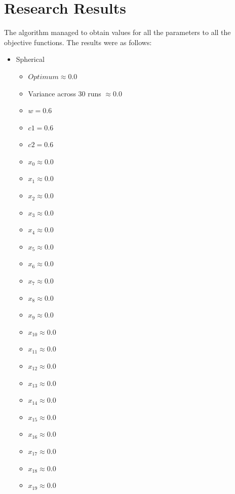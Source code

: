 \documentclass[hidelinks,english,conference]{IEEEtran}
\begin{document}
\section{Research Results}\label{researchResultsSection}
The algorithm managed to obtain values for all the parameters to all the objective functions. The results were as follows:
\begin{itemize}
	\item Spherical\\
		\begin{itemize}
			\item $Optimum \approx 0.0$
			\item Variance across 30 runs $ \approx 0.0$
			\item $w = 0.6$
			\item $c1 = 0.6$
			\item $c2 = 0.6$
			\item $x_{0} \approx 0.0$
			\item $x_{1} \approx 0.0$
			\item $x_{2} \approx 0.0$
			\item $x_{3} \approx 0.0$
			\item $x_{4} \approx 0.0$
			\item $x_{5} \approx 0.0$
			\item $x_{6} \approx 0.0$
			\item $x_{7} \approx 0.0$
			\item $x_{8} \approx 0.0$
			\item $x_{9} \approx 0.0$
			\item $x_{10} \approx 0.0$
			\item $x_{11} \approx 0.0$
			\item $x_{12} \approx 0.0$
			\item $x_{13} \approx 0.0$
			\item $x_{14} \approx 0.0$
			\item $x_{15} \approx 0.0$
			\item $x_{16} \approx 0.0$
			\item $x_{17} \approx 0.0$
			\item $x_{18} \approx 0.0$
			\item $x_{19} \approx 0.0$
			

\end{itemize}
\end{itemize}
\end{document}
